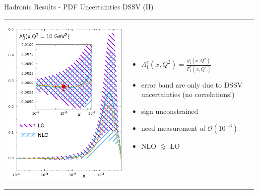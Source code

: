 \begin{frame}{Hadronic Results - PDF Uncertainties DSSV (II)}
\begin{tabular}{wn}
\begin{center}
\includegraphics[height=.97\textheight]{img/A1-pdf-data}
\end{center} & 
\begin{itemize}
\item $A_1^c(x,Q^2) = \frac{g_1^c(x,Q^2)}{F_1^c(x,Q^2)}$
\item error band are only due to DSSV uncertainties (no correlations!)
\item sign unconstrained
\item need measurement of $\mathcal O(10^{-3})$
\item NLO $\lessapprox$ LO
\end{itemize}
\end{tabular}
\end{frame}

